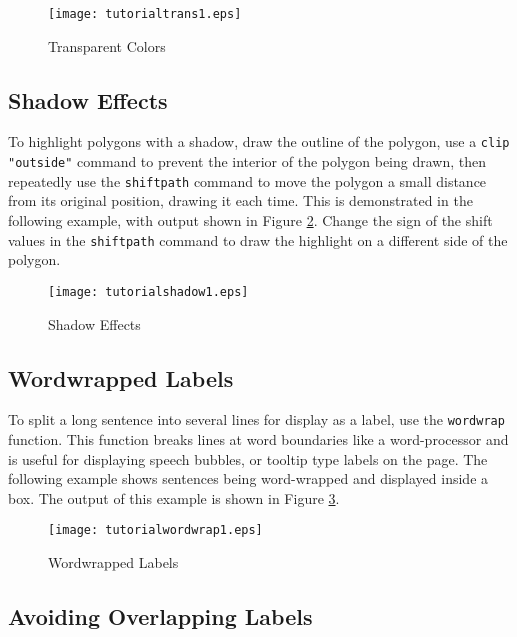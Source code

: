 \begin{figure}[htb]
\texttt{[image: tutorialtrans1.eps]}
\caption{Transparent Colors}
\label{tutorialtrans1}
\end{figure}

\subsection{Shadow Effects}
\label{tutorialshadow}

To highlight polygons with a shadow, draw the outline of the polygon, use a
\texttt{clip "outside"}
command to prevent the interior of the polygon being drawn,
then repeatedly use the \texttt{shiftpath} command to move the polygon a small
distance from its original position, drawing it each time.  This is
demonstrated in the following example, with output shown in Figure
\ref{tutorialshadow1}.  Change the sign of the shift values in the
\texttt{shiftpath} command to draw the highlight on a different side of the
polygon.



\begin{figure}[htb]
\texttt{[image: tutorialshadow1.eps]}
\caption{Shadow Effects}
\label{tutorialshadow1}
\end{figure}

\subsection{Wordwrapped Labels}

To split a long sentence into several lines for display as a label, use
the \texttt{wordwrap} function.
This function breaks lines at word boundaries like a word-processor
and is useful for displaying speech bubbles, or tooltip type
labels on the page.
The following example shows sentences being word-wrapped and
displayed inside a box.  The output of this example
is shown in Figure \ref{tutorialwordwrap1}.



\begin{figure}[htb]
\texttt{[image: tutorialwordwrap1.eps]}
\caption{Wordwrapped Labels}
\label{tutorialwordwrap1}
\end{figure}

\subsection{Avoiding Overlapping Labels}

